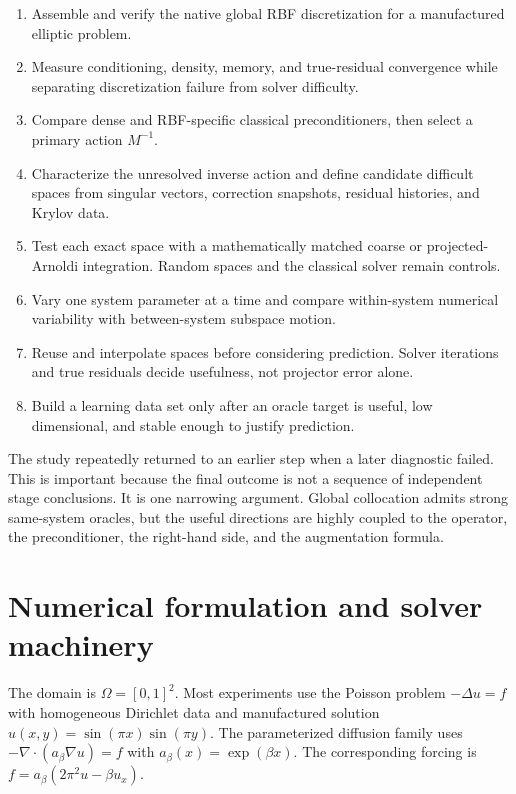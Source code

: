 \documentclass[11pt]{article}
\begin{document}
\begin{enumerate}[label=\textbf{\arabic*.}]
  \item Assemble and verify the native global RBF discretization for a manufactured elliptic problem.
  \item Measure conditioning, density, memory, and true-residual convergence while separating discretization failure from solver difficulty.
  \item Compare dense and RBF-specific classical preconditioners, then select a primary action $M^{-1}$.
  \item Characterize the unresolved inverse action and define candidate difficult spaces from singular vectors, correction snapshots, residual histories, and Krylov data.
  \item Test each exact space with a mathematically matched coarse or projected-Arnoldi integration. Random spaces and the classical solver remain controls.
  \item Vary one system parameter at a time and compare within-system numerical variability with between-system subspace motion.
  \item Reuse and interpolate spaces before considering prediction. Solver iterations and true residuals decide usefulness, not projector error alone.
  \item Build a learning data set only after an oracle target is useful, low dimensional, and stable enough to justify prediction.
\end{enumerate}

The study repeatedly returned to an earlier step when a later diagnostic failed. This is important because the final outcome is not a sequence of independent stage conclusions. It is one narrowing argument. Global collocation admits strong same-system oracles, but the useful directions are highly coupled to the operator, the preconditioner, the right-hand side, and the augmentation formula.

\section{Numerical formulation and solver machinery}

The domain is $\Omega=[0,1]^2$. Most experiments use the Poisson problem $-\Delta u=f$ with homogeneous Dirichlet data and manufactured solution $u(x,y)=\sin(\pi x)\sin(\pi y)$. The parameterized diffusion family uses $-\nabla\cdot(a_\beta\nabla u)=f$ with $a_\beta(x)=\exp(\beta x)$. The corresponding forcing is $f=a_\beta(2\pi^2u-\beta u_x)$.
\end{document}
